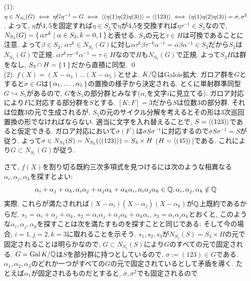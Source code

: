 {\begin{probans} %
(1): $\eta\in N_{S_{5}}(G) \iff \eta G\eta^{-1} = G \iff \langle (\eta(1) \eta(2) \eta(3)) \rangle = \langle (123) \rangle \iff (\eta(1) \eta(2)\eta(3)) = \sigma, \sigma^2$. よって, $\eta$が$4,5$を固定すれば$\eta\in S_3$で$\eta$が4,5を交換すれば$\eta\tau^{-1} \in S_3$なので, $N_{S_5}(G) = \set{\alpha\tau^k \mid  \alpha\in S_3, k=0,1}$と表せる. $S_3$の元と$\tau\in H$は可換であることに注意. よって$\beta\in S_3$, $\alpha\tau^k\in N_{S_5}(G)$に対し$\alpha\tau^k \beta \tau^{-k} \alpha^{-1} = \alpha\beta\alpha^{-1} \in S_3$だから$S_3$は$N_{S_5}(G)$で正規. $\alpha\tau^k\tau \tau^{-k}\alpha^{-1} = \tau\in H$なので$H$も$N_{S_5}(G)$で正規. よって$S_3H$は群をなし, $S_3\cap H = \set{1}$だから直積に同型. \qed \\
(2): $f(X) = (X-\alpha_1)\dots (X-\alpha_5)$とせよ. $K/\mathbb{Q}$はGalois拡大. ガロア群を$G$とすると$\sigma\in G$は$\set{\alpha_1,\dots, \alpha_5}$の置換の様子から決定される. とくに単射群準同型$G\hookrightarrow S_5$があるので, $G$を$S_5$の部分群とみなす($\alpha_i$を文字$i$に見立てる). ガロア対応により$F$に対応する部分群を$S$とする. $[K:F] = 3$だから$S$は位数3の部分群. それは位数3の元で生成されるが, $S_5$の元のサイクル分解を考えるとその形は3次巡回置換の形でなければならない. 適当に文字を入れ替えることで, $S = \langle (123) \rangle$であると仮定できる.  ガロア対応において$\sigma(F)$は$\sigma S \sigma^{-1}$に対応するので$\sigma S \sigma^{-1}  =  S$が従う. よって$\sigma \in N_{S_5}(S) = N_{S_5}(\langle (123)\rangle) = S_3\times H$ ($H = \langle (45) \rangle$)である. これにより$G\subset N_{S_5}(G)$が従う. \par
さて, $f(X)$を割り切る既約三次多項式を見つけるには次のような相異なる$\alpha_i,\alpha_j,\alpha_k$を探すとよい:
\[\alpha_i + \alpha_j + \alpha_k, \alpha_i\alpha_j + \alpha_j \alpha_k + \alpha_k\alpha_i, \alpha_i\alpha_j\alpha_k \in \mathbb{Q}, \alpha_i,\alpha_j,\alpha_k \notin \mathbb{Q}\]
実際, これらが満たされれば$(X-\alpha_i)(X-\alpha_j)(X-\alpha_k)$が$\mathbb{Q}$上既約であるからだ. $s_1 = \alpha_i + \alpha_j + \alpha_k$, $s_2 = \alpha_i\alpha_j + \alpha_j\alpha_k + \alpha_k \alpha_i$, $s_3 = \alpha_i\alpha_j\alpha_k$とおくと, このような$\alpha_i,\alpha_j,\alpha_k$を探すことは次を満たすものを探すことと同じである:
そして今の場合, $i=1,j=2,k=3$に取れることを示そう. $s_1,s_2,s_3$が$N_{S_5}(S) = S_{3}\times H$の元で固定されることは明らかなので, $G\subset N_{S_5}(S)$により$G$のすべての元で固定される. $G=\operatorname{Gal}{K/\mathbb{Q}}$は$S$を部分群に持つとしているので, $\sigma := (123)\in G$である. $\alpha_1,\alpha_2,\alpha_3$のどれか一つがすべての$G$の元で固定されているとして矛盾を導く. たとえば$\alpha_1$が固定されるものだとすると, $\sigma,\sigma^2$でも固定されるので

\end{probans}}
